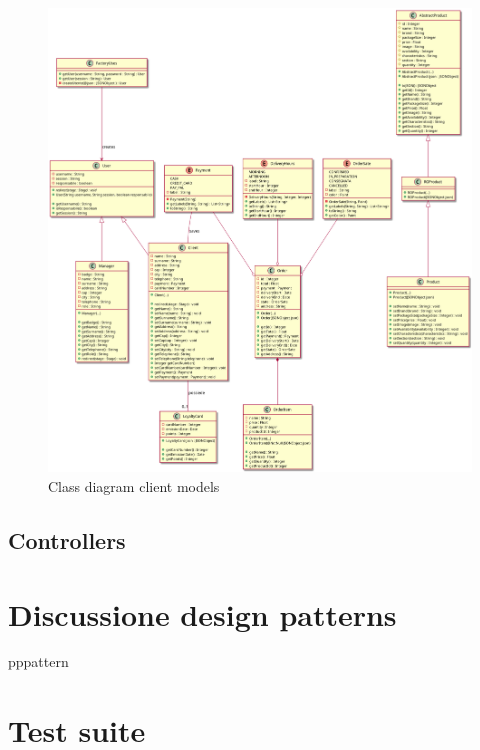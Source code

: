 \documentclass[12pt, a4paper]{article}
\begin{document}
\begin{figure}[h]
\centering
\includegraphics[width=\textwidth]{client_models_class.png}
\caption{Class diagram client models}
\end{figure}


\subsection{Controllers}


\section{Discussione design patterns}

pppattern


\section{Test suite}
\end{document}

